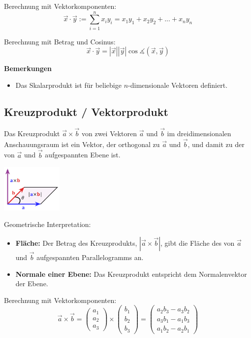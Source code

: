 \documentclass[10pt,a4paper,twocolumn]{article}
\begin{document}
Berechnung mit Vektorkomponenten:
\[
\vec{x}\cdot\vec{y}:=\sum_{i=1}^{n}x_iy_i=x_1y_1+x_2y_2+...+x_ny_n
\]

Berechnung mit Betrag und Cosinus:
\[
\vec{x}\cdot\vec{y}=|\vec{x}||\vec{y}|\cos\measuredangle(\vec{x},\vec{y})
\]

\textbf{Bemerkungen}
\begin{itemize}
\item Das Skalarprodukt ist für beliebige $n$-dimensionale Vektoren definiert.
\end{itemize}

\subsection{Kreuzprodukt / Vektorprodukt}
Das Kreuzprodukt $\vec{a}\times\vec{b}$ von zwei Vektoren $\vec{a}$ und $\vec{b}$ im dreidimensionalen Anschauungsraum ist ein Vektor, der orthogonal zu $\vec{a}$ und $\vec{b}$, und damit zu der von $\vec{a}$ und $\vec{b}$ aufgespannten Ebene ist.

\begin{center}
\includegraphics[width=3cm]{images/vectorproduct.png}
\end{center}

Geometrische Interpretation:
\begin{itemize}
\item \textbf{Fläche:} Der Betrag des Kreuzprodukts, $|\vec{a}\times\vec{b}|$, gibt die Fläche des von $\vec{a}$ und $\vec{b}$ aufgespannten Parallelogramms an.
\item \textbf{Normale einer Ebene:} Das Kreuzprodukt entspricht dem Normalenvektor der Ebene.
\end{itemize}

Berechnung mit Vektorkomponenten:
\[
\vec{a}\times\vec{b}=
\left(
\begin{array}{c}
  a_1 \\
  a_2 \\
  a_3
\end{array}
\right)
\times
\left(
\begin{array}{c}
  b_1 \\
  b_2 \\
  b_3
\end{array}
\right)
=
\left(
\begin{array}{c}
  a_2b_3-a_3b_2 \\
  a_3b_1-a_1b_3 \\
  a_1b_2-a_2b_1
\end{array}
\right)
\]
\end{document}
